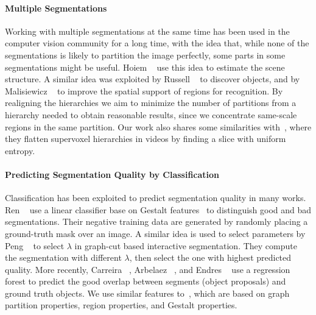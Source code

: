 \paragraph{Multiple Segmentations}
Working with multiple segmentations at the same time has been used in the computer vision community
for a long time, with the idea that, while none of the segmentations is likely to partition the image perfectly, some parts in some segmentations might be useful.
Hoiem \etal~\citep{hoiem2005geometric} use this idea to estimate the scene structure.
A similar idea was exploited by Russell \etal~\citep{russell2006using} to discover objects,
and by Malisiewicz \etal~\citep{malisiewicz2007improving} to improve the spatial support of regions for
recognition.
By realigning the hierarchies we aim to minimize the number of partitions from a hierarchy needed to obtain
reasonable results, since we concentrate same-scale regions in the same partition.
Our work also shares some similarities with~\citep{xu2013flattening}, where they flatten supervoxel
hierarchies in videos by finding a slice with uniform entropy.


\paragraph{Predicting Segmentation Quality by Classification}
Classification has been exploited to predict segmentation quality in many works.
Ren \etal~\citep{ren2003learning} use a linear classifier base on Gestalt features~\citep{palmer1999vision}
to distinguish good and bad segmentations.
Their negative training data are generated by randomly placing a ground-truth mask over an image.
A similar idea is used to select parameters by Peng \etal~\citep{peng2008parameter} to select $\lambda$ in 
graph-cut based interactive segmentation.
They compute the segmentation with different $\lambda$, then select the one with highest predicted quality. 
More recently, Carreira \etal~\citep{carreira2010constrained}, Arbelaez \etal~\citep{arbelaez2014multiscale},
and Endres \etal~\citep{endres2014category} use a regression forest to predict the good overlap between
segments (object proposals) and ground truth objects.
We use similar features to~\citep{carreira2010constrained}, which are based on graph partition properties,
region properties, and Gestalt properties.

